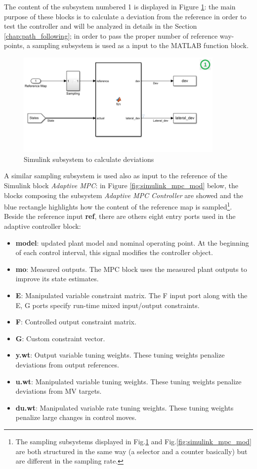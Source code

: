 The content of the subsystem numbered 1 is displayed in Figure \ref{fig:simulink_deviations_mod}: the main purpose of these blocks is to calculate a deviation from the reference in order to test the controller and will be analyzed in details in the Section \ref{chap:path_following}; in order to pass the proper number of reference way-points, a sampling subsystem is used as a input to the MATLAB function block.
\begin{figure}[H]
    \centering
    \includegraphics[width=0.9\textwidth]{Figures/simulink_deviations_mod.png}
    \caption{Simulink subsystem to calculate deviations}
    \label{fig:simulink_deviations_mod}
\end{figure}
 A similar sampling subsystem is used also as input to the reference of the Simulink block \textit{Adaptive MPC}: in Figure \ref{fig:simulink_mpc_mod} below, the blocks composing the subsystem \textit{Adaptive MPC Controller} are showed and the blue rectangle highlights how the content of the reference map is sampled\footnote{The sampling subsystems displayed in Fig.\ref{fig:simulink_deviations_mod} and Fig.\ref{fig:simulink_mpc_mod} are both structured in the same way (a selector and a counter basically) but are different in the sampling rate.}. Beside the reference input \textbf{ref}, there are others eight entry ports used in the adaptive controller block:
 \begin{itemize}
     \item \textbf{model}: updated plant model and nominal operating point. At the beginning of each control interval, this signal modifies the controller object.
     \item \textbf{mo}: Measured outputs. The MPC block uses the measured plant outputs to improve its state estimates.
     \item \textbf{E}: Manipulated variable constraint matrix. The F input port along with the E, G ports specify run-time mixed input/output constraints.
     \item \textbf{F}: Controlled output constraint matrix.
     \item \textbf{G}: Custom constraint vector.
     \item \textbf{y.wt}: Output variable tuning weights. These tuning weights penalize deviations from output references.
     \item \textbf{u.wt}: Manipulated variable tuning weights.  These tuning weights penalize deviations from MV targets.
     \item \textbf{du.wt}: Manipulated variable rate tuning weights. These tuning weights penalize large changes in control moves.
 \end{itemize}     
